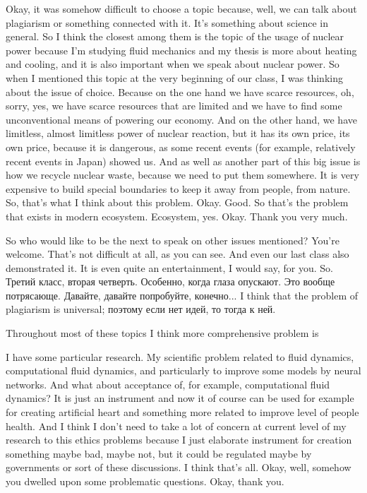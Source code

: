 \documentclass[main.tex]{subfiles}
\begin{document}
Okay, it was somehow difficult to choose a topic because, well, we can talk about plagiarism or something connected with it.
It's something about science in general.
So I think the closest among them is the topic of the usage of nuclear power because I'm studying fluid mechanics and my thesis is more about heating and cooling, and it is also important when we speak about nuclear power.
So when I mentioned this topic at the very beginning of our class, I was thinking about the issue of choice.
Because on the one hand we have scarce resources, oh, sorry, yes, we have scarce resources that are limited and we have to find some unconventional means of powering our economy.
And on the other hand, we have limitless, almost limitless power of nuclear reaction, but it has its own price, its own price, because it is dangerous, as some recent events (for example, relatively recent events in Japan) showed us.
And as well as another part of this big issue is how we recycle nuclear waste, because we need to put them somewhere.
It is very expensive to build special boundaries to keep it away from people, from nature.
So, that's what I think about this problem.
Okay.
Good.
So that's the problem that exists in modern ecosystem.
Ecosystem, yes.
Okay.
Thank you very much.

So who would like to be the next to speak on other issues mentioned?
You're welcome.
That's not difficult at all, as you can see.
And even our last class also demonstrated it.
It is even quite an entertainment, I would say, for you.
So.
Третий класс, вторая четверть.
Особенно, когда глаза опускают.
Это вообще потрясающе.
Давайте, давайте попробуйте, конечно...
I think that the problem of plagiarism is universal; поэтому если нет идей, то тогда к ней.


Throughout most of these topics I think more comprehensive problem is 

I have some particular research.
My scientific problem related to fluid dynamics, computational fluid dynamics, and particularly to improve some models by neural networks.
And what about acceptance of, for example, computational fluid dynamics?
It is just an instrument and now it of course can be used for example for creating artificial heart and something more related to improve level of people health.
And I think I don't need to take a lot of concern at current level of my research to this ethics problems because I just elaborate instrument for creation something maybe bad, maybe not, but it could be regulated maybe by governments or sort of these discussions.
I think that's all.
Okay, well, somehow you dwelled upon some problematic questions.
Okay, thank you.
\end{document}
